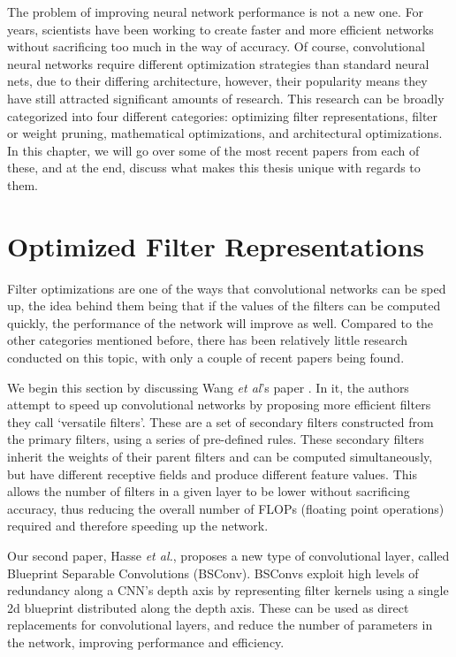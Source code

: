 \documentclass[11pt,a4paper,oldfontcommands]{memoir}
\begin{document}
The problem of improving neural network performance is not a new one. For years, scientists have been working to create faster and more efficient networks without sacrificing too much in the way of accuracy. Of course, convolutional neural networks require different optimization strategies than standard neural nets, due to their differing architecture, however, their popularity means they have still attracted significant amounts of research. This research can be broadly categorized into four different categories: optimizing filter representations, filter or weight pruning, mathematical optimizations, and architectural optimizations. In this chapter, we will go over some of the most recent papers from each of these, and at the end, discuss what makes this thesis unique with regards to them. 

\section{Optimized Filter Representations}
Filter optimizations are one of the ways that convolutional networks can be sped up, the idea behind them being that if the values of the filters can be computed quickly, the performance of the network will improve as well. Compared to the other categories mentioned before, there has been relatively little research conducted on this topic, with only a couple of recent papers being found.

We begin this section by discussing Wang \textit{et al}'s paper \cite{Versatile}. In it, the authors attempt to speed up convolutional networks by proposing more efficient filters they call `versatile filters'. These are a set of secondary filters constructed from the primary filters, using a series of pre-defined rules. These secondary filters inherit the weights of their parent filters and can be computed simultaneously, but have different receptive fields and produce different feature values. This allows the number of filters in a given layer to be lower without sacrificing accuracy, thus reducing the overall number of FLOPs (floating point operations) required and therefore speeding up the network. 

Our second paper, Hasse \textit{et al.}, \cite{Depthwise} proposes a new type of convolutional layer, called Blueprint Separable Convolutions (BSConv). BSConvs exploit high levels of redundancy along a CNN's depth axis by representing filter kernels using a single 2d blueprint distributed along the depth axis. These can be used as direct replacements for convolutional layers, and reduce the number of parameters in the network, improving performance and efficiency.
\end{document}
